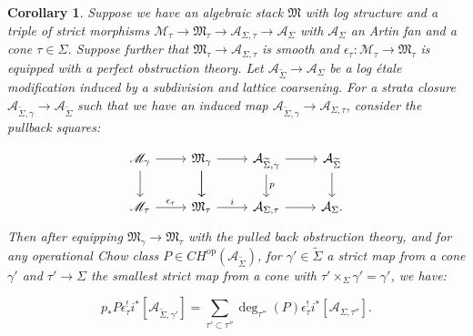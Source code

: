 \documentclass[12pt, oneside]{amsart}   	%
\newcounter{thm}
\newtheorem{corollary}[thm]{Corollary}
\numberwithin{equation}{section}
\numberwithin{thm}{section}
\numberwithin{figure}{section}
\begin{document}
\begin{corollary}\label{pushvpull}
Suppose we have an algebraic stack $\mathfrak{M}$ with log structure and a triple of strict morphisms $\mathscr{M}_{\tau} \rightarrow \mathfrak{M}_{\tau} \rightarrow \mathcal{A}_{\Sigma,\tau} \rightarrow \mathcal{A}_{\Sigma}$ with $\mathcal{A}_{\Sigma}$ an Artin fan and a cone $\tau \in \Sigma$. Suppose further that $\mathfrak{M}_{\tau} \rightarrow \mathcal{A}_{\Sigma,\tau}$ is smooth and $\epsilon_{\tau}: \mathscr{M}_{\tau} \rightarrow \mathfrak{M}_{\tau}$ is equipped with a perfect obstruction theory. Let $\mathcal{A}_{\widetilde{\Sigma}} \rightarrow \mathcal{A}_{\Sigma}$ be a log \'etale modification induced by a subdivision and lattice coarsening. For a strata closure $\mathcal{A}_{\widetilde{\Sigma},\gamma} \rightarrow \mathcal{A}_{\widetilde{\Sigma}}$ such that we have an induced map $\mathcal{A}_{\widetilde{\Sigma},\gamma} \rightarrow \mathcal{A}_{\Sigma,\tau}$, consider the pullback squares:


\begin{equation}
\begin{tikzcd}
\mathscr{M}_{\gamma}\arrow[r] \arrow{d} & \arrow{d}\mathfrak{M}_{\gamma} \arrow[r]\arrow[d] & \mathcal{A}_{\widetilde{\Sigma},\gamma}\arrow[d,"p"] \arrow{r}& \mathcal{A}_{\widetilde{\Sigma}}\arrow{d}\\
\mathscr{M}_{\tau}\arrow[r,"\epsilon_{\tau}"]& \mathfrak{M}_{\tau}\arrow[r,"i"] & \mathcal{A}_{\Sigma,\tau} \arrow{r} & \mathcal{A}_{\Sigma}.
\end{tikzcd}
\end{equation}
Then after equipping $\mathfrak{M}_{\gamma} \rightarrow \mathfrak{M}_{\tau}$ with the pulled back obstruction theory, and for any operational Chow class $P \in CH^{\text{op}}(\mathcal{A}_{\widetilde{\Sigma}})$, for $\gamma' \in \widetilde{\Sigma}$ a strict map from a cone $\gamma'$ and $\tau'\rightarrow \Sigma$ the smallest strict map from a cone with $\tau'\times_{\Sigma} \gamma' = \gamma'$, we have:

\begin{equation}
p_*P\epsilon_{\tau}^!i^*[\mathcal{A}_{\widetilde{\Sigma},\gamma'}] = \sum_{\tau' \subset \tau''}\deg_{\tau''}(P)\epsilon_{\tau}^!i^*[\mathcal{A}_{\Sigma,\tau''}].
\end{equation}
\end{corollary}
\end{document}
